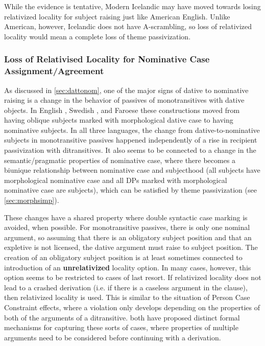While the evidence is tentative, Modern Icelandic may have moved towards losing relativized locality for subject raising just like American English.  Unlike American, however, Icelandic does not have A-scrambling, so loss of relativized locality would mean a complete loss of theme passivization.

\subsubsection{Loss of Relativised Locality for Nominative Case Assignment/Agreement}\label{sec:lossrlcase}

As discussed in \autoref{sec:dattonom}, one of the major signs of dative to nominative raising is a change in the behavior of passives of monotransitives with dative objects. In English \citep{Allen.1999}, Swedish \citep{Falk.1997}, and Faroese \citep{Arnadottir.2013} these constructions moved from having oblique subjects marked with morphological dative case to having nominative subjects. In all three languages, the change from dative-to-nominative subjects in monotransitive passives happened independently of a rise in recipient passivization with ditransitives. It also seems to be connected to a change in the semantic/pragmatic properties of nominative case, where there becomes a biunique relationship between nominative case and subjecthood (all subjects have morphological nominative case and all DPs marked with morphological nominative case are subjects), which can be satisfied by theme passivization (see \autoref{sec:morphsimp}).

These changes have a shared property where double syntactic case marking is avoided, when possible. For monotransitive passives, there is only one nominal argument, so assuming that there is an obligatory subject position and that an expletive is not licensed, the dative argument must raise to subject position. The creation of an obligatory subject position is at least sometimes connected to introduction of an \textbf{unrelativized} locality option. In many cases, however, this option seems to be restricted to cases of last resort. If relativized locality does not lead to a crashed derivation (i.e. if there is a caseless argument in the clause), then relativized locality is used. This is similar to the situation of Person Case Constraint effects, where a violation only develops depending on the properties of both of the arguments of a ditransitive. \cite{Richards.2008,Nevins.2011} both have proposed distinct formal mechanisms for capturing these sorts of cases, where properties of multiple arguments need to be considered before continuing with a derivation. 

